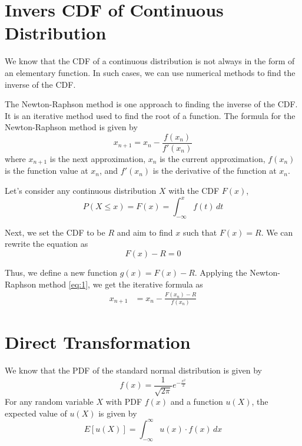 \documentclass{article}
\begin{document}
\pagestyle{fancy}
\section*{Invers CDF of Continuous Distribution} 

We know that the CDF of a continuous distribution is not always in the form of an elementary function. In such cases, we can use numerical methods to find the inverse of the CDF.

The Newton-Raphson method is one approach to finding the inverse of the CDF. It is an iterative method used to find the root of a function. The formula for the Newton-Raphson method is given by
\begin{equation}
    x_{n+1} = x_n - \frac{f(x_n)}{f'(x_n)}\label{eq:1}
\end{equation}
where \(x_{n+1}\) is the next approximation, \(x_n\) is the current approximation, \(f(x_n)\) is the function value at \(x_n\), and \(f'(x_n)\) is the derivative of the function at \(x_n\).

Let's consider any continuous distribution \(X\) with the CDF \(F(x)\),
\begin{equation}
    P(X\leq x) = F(x) = \int_{-\infty}^{x} f(t) \, dt
\end{equation}

Next, we set the CDF to be \(R\) and aim to find \(x\) such that \(F(x) = R\). We can rewrite the equation as
\begin{equation}
    F(x) - R = 0
\end{equation}

Thus, we define a new function \(g(x) = F(x) - R\). Applying the Newton-Raphson method \eqref{eq:1}, we get the iterative formula as
\begin{align}
    x_{n+1} &= x_n - \frac{F(x_n) - R}{f(x_n)}
\end{align}

\section*{Direct Transformation}
We know that the PDF of the standard normal distribution is given by
\begin{equation}
    f(x) = \frac{1}{\sqrt{2\pi}} e^{-\frac{x^2}{2}}
\end{equation}
For any random variable \(X\) with PDF \(f(x)\) and a function \(u(X)\), the expected value of \(u(X)\) is given by
\begin{equation}
    E[u(X)] = \int_{-\infty}^{\infty} u(x) \cdot f(x) \, dx
\end{equation}
\end{document}

